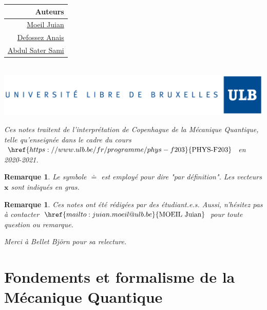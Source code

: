 \documentclass{book}
\numberwithin{equation}{part}
\newtheorem{remark}[theorem]{Remarque}
\begin{document}
\begin{titlepage}
\begin{minipage}{\linewidth}
\begin{minipage}{0.45\linewidth}
\begin{center}
            \end{center}
        \end{minipage}
        \begin{minipage}{0.5\linewidth}
            \begin{flushright}
                \begin{tabular}{r}
                    Auteurs \\
                    \hline
                    \href{mailto:juian.moeil@ulb.be}{Moeil Juian} \\
                    \href{mailto:anais.defossez@ulb.be}{Defossez Anais} \\
                    \href{mailto:sami.abdul.sater@ulb.be}{Abdul Sater Sami}
                \end{tabular}
            \end{flushright}
        \end{minipage}
    \end{minipage}
    \\
    \vfill
    \includegraphics[scale=0.5]{Images/ULB.jpg} \\
\end{titlepage}
\makeatother

\newpage
\tableofcontents

\newpage
\textit{Ces notes traitent de l'interprétation de Copenhague de la Mécanique Quantique, telle qu'enseignée dans le cadre du cours $\href{https://www.ulb.be/fr/programme/phys-f203}{\text{PHYS-F203}}$ en 2020-2021.}

\begin{remark}
    Le symbole $\doteq$ est employé pour dire "par définition". Les vecteurs $\bm{x}$ sont indiqués en gras.
\end{remark}

\begin{remark}
    Ces notes ont été rédigées par des étudiant.e.s. Aussi, n'hésitez pas à contacter $\href{mailto:juian.moeil@ulb.be}{\text{MOEIL Juian}}$ pour toute question ou remarque.
\end{remark}

\textit{Merci à Bellet Björn pour sa relecture.}

\part{Fondements et formalisme de la Mécanique Quantique}
\newpage
\newpage
\newpage
\newpage
\end{document}
